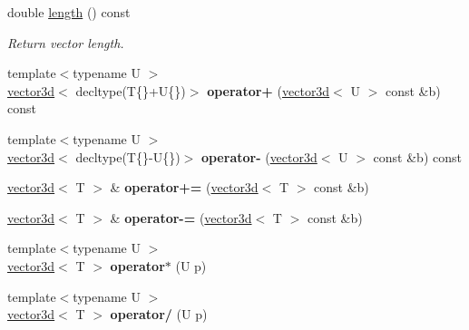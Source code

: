 \begin{DoxyCompactItemize}
double \hyperlink{classgeometry3d_1_1vector3d_aacdba0ec1e2b089555c7328c54b715e2}{length} () const 
\begin{DoxyCompactList}\small\item\em Return vector length. \end{DoxyCompactList}\item 
\hypertarget{classgeometry3d_1_1vector3d_a4d815473123def0d2138fe0fd9ba1cca}{}{\footnotesize template$<$typename U $>$ }\\\hyperlink{classgeometry3d_1_1vector3d}{vector3d}$<$ decltype(T\{\}+U\{\})$>$ {\bfseries operator+} (\hyperlink{classgeometry3d_1_1vector3d}{vector3d}$<$ U $>$ const \&b) const \label{classgeometry3d_1_1vector3d_a4d815473123def0d2138fe0fd9ba1cca}

\item 
\hypertarget{classgeometry3d_1_1vector3d_adc166af2aac8b884de8d3fb2972e5b38}{}{\footnotesize template$<$typename U $>$ }\\\hyperlink{classgeometry3d_1_1vector3d}{vector3d}$<$ decltype(T\{\}-\/U\{\})$>$ {\bfseries operator-\/} (\hyperlink{classgeometry3d_1_1vector3d}{vector3d}$<$ U $>$ const \&b) const \label{classgeometry3d_1_1vector3d_adc166af2aac8b884de8d3fb2972e5b38}

\item 
\hypertarget{classgeometry3d_1_1vector3d_a58d57f2221d819082feaafc986ff45a5}{}\hyperlink{classgeometry3d_1_1vector3d}{vector3d}$<$ T $>$ \& {\bfseries operator+=} (\hyperlink{classgeometry3d_1_1vector3d}{vector3d}$<$ T $>$ const \&b)\label{classgeometry3d_1_1vector3d_a58d57f2221d819082feaafc986ff45a5}

\item 
\hypertarget{classgeometry3d_1_1vector3d_a0840f5c67242ab2527d8dee7a29f2ec3}{}\hyperlink{classgeometry3d_1_1vector3d}{vector3d}$<$ T $>$ \& {\bfseries operator-\/=} (\hyperlink{classgeometry3d_1_1vector3d}{vector3d}$<$ T $>$ const \&b)\label{classgeometry3d_1_1vector3d_a0840f5c67242ab2527d8dee7a29f2ec3}

\item 
\hypertarget{classgeometry3d_1_1vector3d_a4920c2aadd7e2af7bfdb65684686fef1}{}{\footnotesize template$<$typename U $>$ }\\\hyperlink{classgeometry3d_1_1vector3d}{vector3d}$<$ T $>$ {\bfseries operator$\ast$} (U p)\label{classgeometry3d_1_1vector3d_a4920c2aadd7e2af7bfdb65684686fef1}

\item 
\hypertarget{classgeometry3d_1_1vector3d_ab7c110d622148fc7ea8ab413e6306bfc}{}{\footnotesize template$<$typename U $>$ }\\\hyperlink{classgeometry3d_1_1vector3d}{vector3d}$<$ T $>$ {\bfseries operator/} (U p)\label{classgeometry3d_1_1vector3d_ab7c110d622148fc7ea8ab413e6306bfc}


\end{DoxyCompactItemize}
